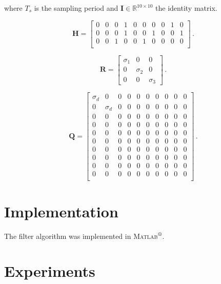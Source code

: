 \noindent
where $T_s$ is the sampling period and $\mathbf{I} \in \mathbb{R}^{10 \times 10}$ the identity matrix.

\begin{equation}
\mathbf{H} = \begin{bmatrix}
  0 & 0 & 0 & 1 & 0 & 0 & 0 & 0 & 1 & 0\\
  0 & 0 & 0 & 1 & 0 & 0 & 1 & 0 & 0 & 1\\
  0 & 0 & 1 & 0 & 0 & 1 & 0 & 0 & 0 & 0\\
\end{bmatrix}\,.
\end{equation}

\begin{equation}
\mathbf{R} = \begin{bmatrix}
  \sigma_1 & 0 & 0\\
  0 & \sigma_2 & 0\\
  0 & 0 & \sigma_3
\end{bmatrix}\,.
\end{equation}

\begin{equation}
\mathbf{Q} = \begin{bmatrix}
  \sigma_d & 0 & 0 & 0 & 0 & 0 & 0 & 0 & 0 & 0\\
  0 & \sigma_d & 0 & 0 & 0 & 0 & 0 & 0 & 0 & 0\\
  0 & 0 & 0 & 0 & 0 & 0 & 0 & 0 & 0 & 0\\
  0 & 0 & 0 & 0 & 0 & 0 & 0 & 0 & 0 & 0\\
  0 & 0 & 0 & 0 & 0 & 0 & 0 & 0 & 0 & 0\\
  0 & 0 & 0 & 0 & 0 & 0 & 0 & 0 & 0 & 0\\
  0 & 0 & 0 & 0 & 0 & 0 & 0 & 0 & 0 & 0\\
  0 & 0 & 0 & 0 & 0 & 0 & 0 & 0 & 0 & 0\\
  0 & 0 & 0 & 0 & 0 & 0 & 0 & 0 & 0 & 0\\
  0 & 0 & 0 & 0 & 0 & 0 & 0 & 0 & 0 & 0\\
\end{bmatrix}\,.
\end{equation}

\section{Implementation}

The filter algorithm was implemented in \textsc{Matlab}$\textsuperscript{\textregistered}$.

\section{Experiments}

